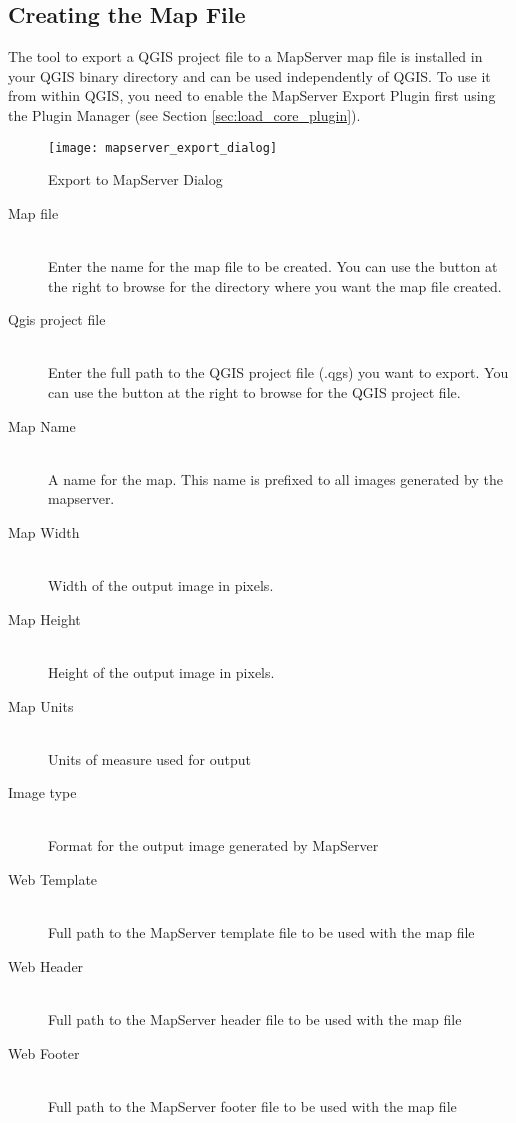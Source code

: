 \subsection{Creating the Map File}

The tool  to export a QGIS project file to a MapServer map 
file is installed in your QGIS binary directory and can be used independently of QGIS. 
To use it from within QGIS, you need to enable the MapServer Export Plugin first using the Plugin Manager (see Section \ref{sec:load_core_plugin}).

\begin{figure}[ht]
\centering
  \texttt{[image: mapserver\_export\_dialog]}
  \caption{Export to MapServer Dialog \nixcaption}
  \label{fig:mapserver_export_dialog}
\end{figure}

\begin{description}
\item [Map file] \mbox{}\\
Enter the name for the map file to be created. You can use the button at the 
right to browse for the directory where you want the map file created. 
\item [Qgis project file] \mbox{}\\
Enter the full path to the QGIS project file (.qgs) you want to export. You can 
use the button at the right to browse for the QGIS project file.
\item [Map Name] \mbox{}\\
A name for the map. This name is prefixed to all images generated by the mapserver.
\item [Map Width] \mbox{}\\
Width of the output image in pixels.
\item [Map Height] \mbox{}\\
Height of the output image in pixels.
\item [Map Units] \mbox{}\\
Units of measure used for output
\item [Image type] \mbox{}\\
Format for the output image generated by MapServer
\item [Web Template] \mbox{}\\
Full path to the MapServer template file to be used with the map file
\item [Web Header] \mbox{}\\
Full path to the MapServer header file to be used with the map file
\item [Web Footer] \mbox{}\\
Full path to the MapServer footer file to be used with the map file
\end{description}

